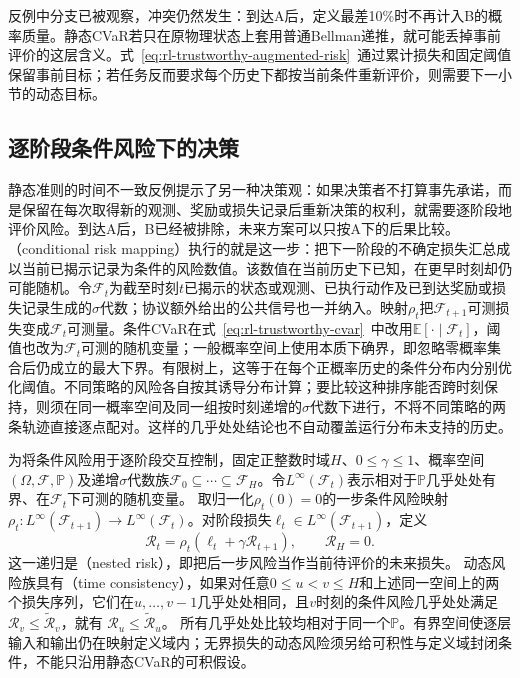 反例中分支已被观察，冲突仍然发生：到达A后，定义最差10\%时不再计入B的概率质量。静态CVaR若只在原物理状态上套用普通Bellman递推，就可能丢掉事前评价的这层含义。式~\eqref{eq:rl-trustworthy-augmented-risk}~通过累计损失和固定阈值保留事前目标；若任务反而要求每个历史下都按当前条件重新评价，则需要下一小节的动态目标。

\subsection{逐阶段条件风险下的决策}
\label{sec:rl-trustworthy-dynamic-risk}

静态准则的时间不一致反例提示了另一种决策观：如果决策者不打算事先承诺，而是保留在每次取得新的观测、奖励或损失记录后重新决策的权利，就需要逐阶段地评价风险。到达A后，B已经被排除，未来方案可以只按A下的后果比较。（conditional risk mapping）执行的就是这一步：把下一阶段的不确定损失汇总成以当前已揭示记录为条件的风险数值。该数值在当前历史下已知，在更早时刻却仍可能随机。令$\mathcal F_t$为截至时刻$t$已揭示的状态或观测、已执行动作及已到达奖励或损失记录生成的$\sigma$代数；协议额外给出的公共信号也一并纳入。映射$\rho_t$把$\mathcal F_{t+1}$可测损失变成$\mathcal F_t$可测量。条件CVaR在式~\eqref{eq:rl-trustworthy-cvar}~中改用$\mathbb E[\cdot\mid\mathcal F_t]$，阈值也改为$\mathcal F_t$可测的随机变量；一般概率空间上使用本质下确界，即忽略零概率集合后仍成立的最大下界。有限树上，这等于在每个正概率历史的条件分布内分别优化阈值。不同策略的风险各自按其诱导分布计算；要比较这种排序能否跨时刻保持，则须在同一概率空间及同一组按时刻递增的$\sigma$代数下进行，不将不同策略的两条轨迹直接逐点配对。这样的几乎处处结论也不自动覆盖运行分布未支持的历史。

为将条件风险用于逐阶段交互控制，固定正整数时域$H$、$0\leq\gamma\leq1$、概率空间$(\Omega,\mathcal F,\mathbb P)$及递增$\sigma$代数族$\mathcal F_0\subseteq\cdots\subseteq\mathcal F_H$。令$L^\infty(\mathcal F_t)$表示相对于$\mathbb P$几乎处处有界、在$\mathcal F_t$下可测的随机变量。
  取归一化$\rho_t(0)=0$的一步条件风险映射$\rho_t:L^\infty(\mathcal F_{t+1})\to L^\infty(\mathcal F_t)$。对阶段损失$\ell_t\in L^\infty(\mathcal F_{t+1})$，定义
  \[
    \mathcal R_t
      =\rho_t(\ell_t+\gamma\mathcal R_{t+1}),
      \qquad \mathcal R_H=0.
  \]
  这一递归是（nested risk），即把后一步风险当作当前待评价的未来损失。
  动态风险族具有（time consistency），如果对任意$0\leq u<v\leq H$和上述同一空间上的两个损失序列，它们在$u,\ldots,v-1$几乎处处相同，且$v$时刻的条件风险几乎处处满足$\mathcal R_v\leq\widetilde{\mathcal R}_v$，就有
  $\mathcal R_u\leq\widetilde{\mathcal R}_u$。
  所有几乎处处比较均相对于同一个$\mathbb P$。有界空间使逐层输入和输出仍在映射定义域内；无界损失的动态风险须另给可积性与定义域封闭条件，不能只沿用静态CVaR的可积假设。

